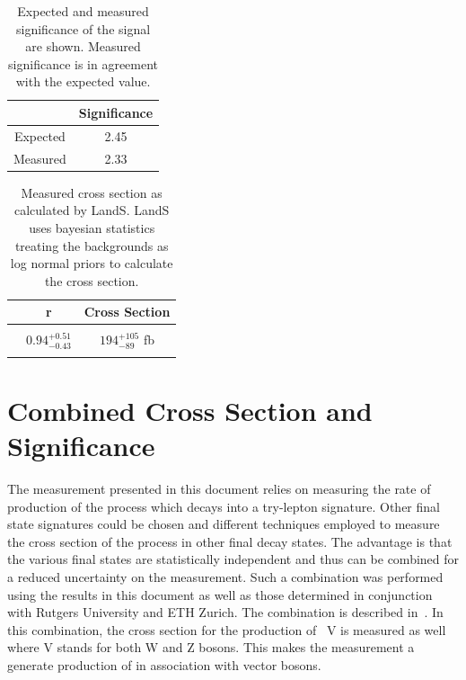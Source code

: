  
 
\begin{table}[ht!]
\caption{ \label{tab:significance} Expected and measured significance of the signal are shown. Measured significance is in agreement with the expected value.}
\begin{center}
\begin{tabular}{c|c}\hline
	& Significance	 \\ \hline
Expected	& 2.45	 \\
Measured	& 2.33	 \\
\hline
\end{tabular}
\end{center}
\end{table}
 
\begin{table}[ht!]
\caption{ \label{tab:landsout} Measured cross section as calculated by LandS. LandS uses bayesian statistics treating the backgrounds as log normal priors to calculate the cross section.}
\begin{center}
\begin{tabular}{c|cc}\hline
	& r        & Cross Section	 \\ \hline
	&  & \\
\ttZ	& $0.94 _{-0.43} ^{+0.51}$ & 	$194 _{-89} ^{+105}$ fb\\
& & \\
\hline
\end{tabular}
\end{center}
\end{table}
 
 
 
 
 
 
 
 \clearpage
 
 
 \section{Combined Cross Section and Significance}
 The measurement presented in this document relies on measuring the rate of production of the \ttZ process which decays into a try-lepton signature. Other final state signatures could be chosen and different techniques employed to measure the cross section of the \ttZ process in other final decay states. The advantage is that the various final states are statistically independent and thus can be combined for a reduced uncertainty on the measurement. Such a combination was performed using the results in this document as well as those determined in conjunction with Rutgers University and ETH Zurich. The combination is described in~\cite{ttV_combination}. In this combination, the cross section for the production of \ttbar~V is measured as well where V stands for both W and Z bosons. This makes the measurement a generate production of \ttbar in association with vector bosons.\\
 
